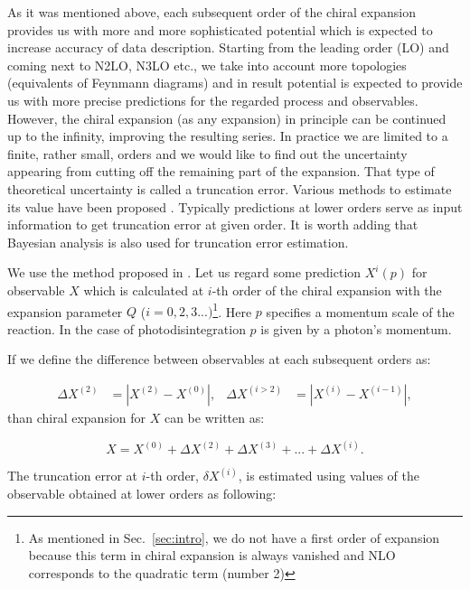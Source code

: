     As it was mentioned above, each subsequent order of the chiral
    expansion provides us with more and more sophisticated
    potential which is expected to increase accuracy of data description.
    Starting from the leading order (LO) and coming next to
    N2LO, N3LO etc., we take into account more topologies (equivalents of Feynmann diagrams) 
    and in result potential is expected to provide us with more precise predictions
    for the regarded process and observables. However, the chiral expansion (as any expansion) 
    in principle can be continued up to the infinity, improving the resulting series.
    In practice we are limited to a finite, rather small, orders 
    and we would like to find out
    the uncertainty appearing from cutting off the remaining part of the expansion.
    That type of theoretical uncertainty is called a truncation error. 
    Various methods to estimate its value
    have been proposed \cite{Epelbaum2014SCS, Epelbaum2015_trunc, Binder2015, Epelbaum_pos, Miller_arxiv}.
    Typically predictions at lower orders serve as input information to get truncation error at given order.
    It is worth adding that Bayesian analysis is also used for truncation error estimation.

    We use the method proposed in \cite{Binder2015}.
    Let us regard some prediction $X^i(p)$ for observable $X$ which is calculated
    at $i$-th order of the chiral expansion 
    with the expansion parameter $Q$ ($i = 0,2,3...)$\footnote{As mentioned in Sec.~\ref{sec:intro}, we do not have a first order of expansion
    because this term in chiral expansion is always vanished
    and NLO  corresponds to the quadratic term (number 2)}.
    Here $p$ specifies a momentum
    scale of the reaction. In the case of photodisintegration $p$ is given by a
    photon's momentum.  

    If we define the difference between observables at each subsequent orders as:

    \begin{align}
        \Delta X^{(2)} &= |X^{(2)} - X^{(0)}|,& \Delta X^{(i>2)} &= |X^{(i)} - X^{(i-1)}|,
    \end{align}
    than chiral expansion for $X$ can be written as:

    \begin{equation}
        X = X^{(0)} + \Delta X^{(2)} + \Delta X^{(3)} + ... + \Delta X^{(i)}.
        \label{trunc1}
    \end{equation}
        
    The truncation error at $i$-th order, $\delta X^{(i)}$, is estimated using
     values of the observable obtained at lower 
    orders as following:

